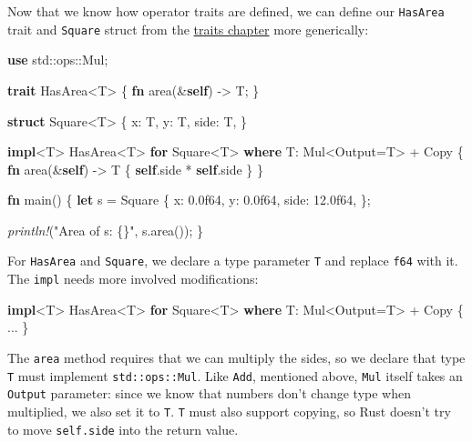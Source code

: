\documentclass[a4paper,]{book}
\newenvironment{Shaded}{\begin{snugshade}}{\end{snugshade}}
\newcommand{\KeywordTok}[1]{\textcolor[rgb]{0.13,0.29,0.53}{\textbf{{#1}}}}
\newcommand{\DecValTok}[1]{\textcolor[rgb]{0.00,0.00,0.81}{{#1}}}
\newcommand{\StringTok}[1]{\textcolor[rgb]{0.31,0.60,0.02}{{#1}}}
\newcommand{\BuiltInTok}[1]{{#1}}
\newcommand{\PreprocessorTok}[1]{\textcolor[rgb]{0.56,0.35,0.01}{\textit{{#1}}}}
\newcommand{\NormalTok}[1]{{#1}}
\begin{document}
Now that we know how operator traits are defined, we can define our
\texttt{HasArea} trait and \texttt{Square} struct from the
\protect\hyperlink{sec--traits}{traits chapter} more generically:

\begin{Shaded}
\begin{Highlighting}[]
\KeywordTok{use} \NormalTok{std::ops::Mul;}

\KeywordTok{trait} \NormalTok{HasArea<T> \{}
    \KeywordTok{fn} \NormalTok{area(&}\KeywordTok{self}\NormalTok{) -> T;}
\NormalTok{\}}

\KeywordTok{struct} \NormalTok{Square<T> \{}
    \NormalTok{x: T,}
    \NormalTok{y: T,}
    \NormalTok{side: T,}
\NormalTok{\}}

\KeywordTok{impl}\NormalTok{<T> HasArea<T> }\KeywordTok{for} \NormalTok{Square<T>}
        \KeywordTok{where} \NormalTok{T: Mul<Output=T> + }\BuiltInTok{Copy} \NormalTok{\{}
    \KeywordTok{fn} \NormalTok{area(&}\KeywordTok{self}\NormalTok{) -> T \{}
        \KeywordTok{self}\NormalTok{.side * }\KeywordTok{self}\NormalTok{.side}
    \NormalTok{\}}
\NormalTok{\}}

\KeywordTok{fn} \NormalTok{main() \{}
    \KeywordTok{let} \NormalTok{s = Square \{}
        \NormalTok{x: }\DecValTok{0.0f64}\NormalTok{,}
        \NormalTok{y: }\DecValTok{0.0f64}\NormalTok{,}
        \NormalTok{side: }\DecValTok{12.0f64}\NormalTok{,}
    \NormalTok{\};}

    \PreprocessorTok{println!}\NormalTok{(}\StringTok{"Area of s: \{\}"}\NormalTok{, s.area());}
\NormalTok{\}}
\end{Highlighting}
\end{Shaded}

For \texttt{HasArea} and \texttt{Square}, we declare a type parameter
\texttt{T} and replace \texttt{f64} with it. The \texttt{impl} needs
more involved modifications:

\begin{Shaded}
\begin{Highlighting}[]
\KeywordTok{impl}\NormalTok{<T> HasArea<T> }\KeywordTok{for} \NormalTok{Square<T>}
        \KeywordTok{where} \NormalTok{T: Mul<Output=T> + }\BuiltInTok{Copy} \NormalTok{\{ ... \}}
\end{Highlighting}
\end{Shaded}

The \texttt{area} method requires that we can multiply the sides, so we
declare that type \texttt{T} must implement \texttt{std::ops::Mul}. Like
\texttt{Add}, mentioned above, \texttt{Mul} itself takes an
\texttt{Output} parameter: since we know that numbers don't change type
when multiplied, we also set it to \texttt{T}. \texttt{T} must also
support copying, so Rust doesn't try to move \texttt{self.side} into the
return value.
\end{document}
